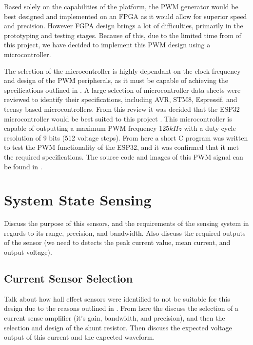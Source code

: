 Based solely on the capabilities of the platform, the PWM generator would be best designed and implemented on an FPGA as it would allow for superior speed and precision. However FGPA design brings a lot of difficulties, primarily in the prototyping and testing stages. Because of this, due to the limited time from of this project, we have decided to implement this PWM design using a microcontroller.

The selection of the microcontroller is highly dependant on the clock frequency and design of the PWM peripherals, as it must be capable of achieving the specifications outlined in . A large selection of microcontroller data-sheets were reviewed to identify their specifications, including AVR, STM8, Espressif, and teensy based microcontrollers. From this review it was decided that the ESP32 microcontroller would be best suited to this project \cite{ESP32Manual}. This microcontroller is capable of outputting a maximum PWM frequency 125$kHz$ with a duty cycle resolution of 9 bits (512 voltage steps). From here a short C program was written to test the PWM functionality of the ESP32, and it was confirmed that it met the required specifications. The source code and images of this PWM signal can be found in .
 

%
%

\section{System State Sensing}\label{S:sensing_design}

Discuss the purpose of this sensors, and the requirements of the sensing system in regards to its range, precision, and bandwidth. Also discuss the required outputs of the sensor (we need to detects the peak current value, mean current, and output voltage). 


\subsection{Current Sensor Selection}\label{S:current_sense_selection}

Talk about how hall effect sensors were identified to not be suitable for this design due to the reasons outlined in . From here the discuss the selection of a current sense amplifier (it's gain, bandwidth, and precision), and then the selection and design of the shunt resistor. Then discuss the expected voltage output of this current and the expected waveform. 


